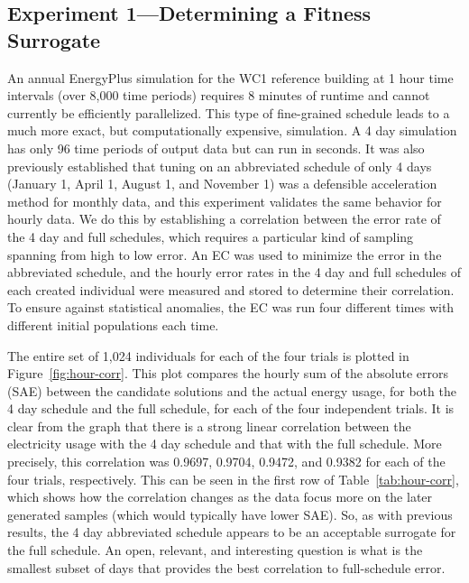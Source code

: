 \documentclass[preprint, review, 12pt]{elsarticle}
\begin{document}
\subsection{Experiment 1---Determining a Fitness Surrogate}
\label{sub:experiment1}
An annual EnergyPlus simulation for the WC1 reference building at 1 hour time intervals (over 8,000 time periods) requires 8 minutes of runtime and cannot currently be efficiently parallelized. This type of fine-grained schedule leads to a much more exact, but computationally expensive, simulation. A 4 day simulation has only 96 time periods of output data but can run in seconds. It was also previously established \cite{cit:garrett2013} that tuning on an abbreviated schedule of only 4 days (January 1, April 1, August 1, and November 1) was a defensible acceleration method for monthly data, and this experiment validates the same behavior for hourly data. We do this by establishing a correlation between the error rate of the 4 day and full schedules, which requires a particular kind of sampling spanning from high to low error. An EC was used to minimize the error in the abbreviated schedule, and the hourly error rates in the 4 day and full schedules of each created individual were measured and stored to determine their correlation. To ensure against statistical anomalies, the EC was run four different times with different initial populations each time.

The entire set of 1,024 individuals for each of the four trials is plotted in Figure~\ref{fig:hour-corr}. This plot compares the hourly sum of the absolute errors (SAE) between the candidate solutions and the actual energy usage, for both the 4 day schedule and the full schedule, for each of the four independent trials. It is clear from the graph that there is a strong linear correlation between the electricity usage with the 4 day schedule and that with the full schedule. More precisely, this correlation was 0.9697, 0.9704, 0.9472, and 0.9382 for each of the four trials, respectively. This can be seen in the first row of Table~\ref{tab:hour-corr}, which shows how the correlation changes as the data focus more on the later generated samples (which would typically have lower SAE). So, as with previous results, the 4 day abbreviated schedule appears to be an acceptable surrogate for the full schedule. An open, relevant, and interesting question is what is the smallest subset of days that provides the best correlation to full-schedule error.
\end{document}
